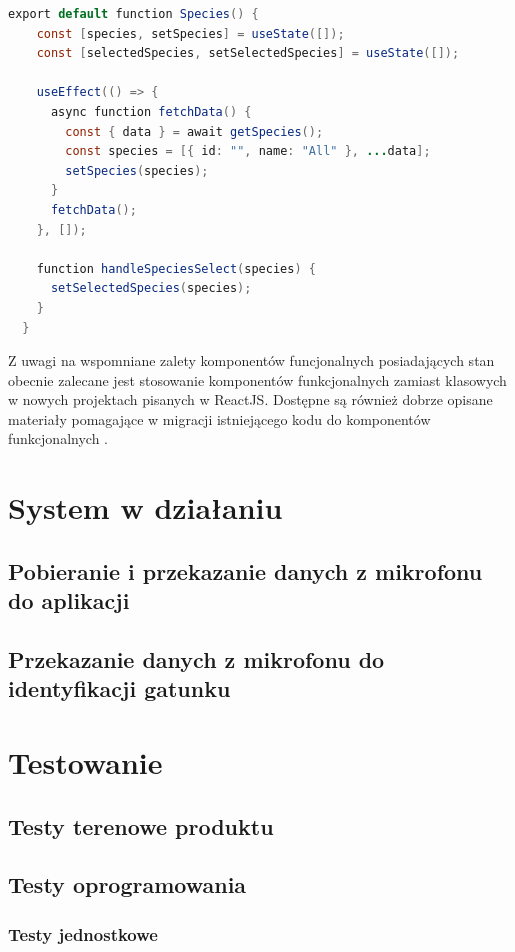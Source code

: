 \documentclass{sprz}
\begin{document}
\begin{lstlisting}[language=Java,caption={Przykład komponentu funcjonalnego}, label={lst:functional_component}]
  export default function Species() {
    const [species, setSpecies] = useState([]);
    const [selectedSpecies, setSelectedSpecies] = useState([]);
  
    useEffect(() => {
      async function fetchData() {
        const { data } = await getSpecies();
        const species = [{ id: "", name: "All" }, ...data];
        setSpecies(species);
      }
      fetchData();
    }, []);
  
    function handleSpeciesSelect(species) {
      setSelectedSpecies(species);
    }
  }
\end{lstlisting}

Z uwagi na wspomniane zalety komponentów funcjonalnych posiadających stan obecnie zalecane jest stosowanie komponentów funkcjonalnych zamiast klasowych w nowych projektach pisanych w ReactJS. Dostępne są również dobrze opisane materiały pomagające w migracji istniejącego kodu do komponentów funkcjonalnych \cite{react-component}.

\chapter{System w działaniu}

\section{Pobieranie i przekazanie danych z mikrofonu do aplikacji}
\section{Przekazanie danych z mikrofonu do identyfikacji gatunku}

\chapter{Testowanie}

\section{Testy terenowe produktu}

\section{Testy oprogramowania}

\subsection{Testy jednostkowe}
\end{document}
